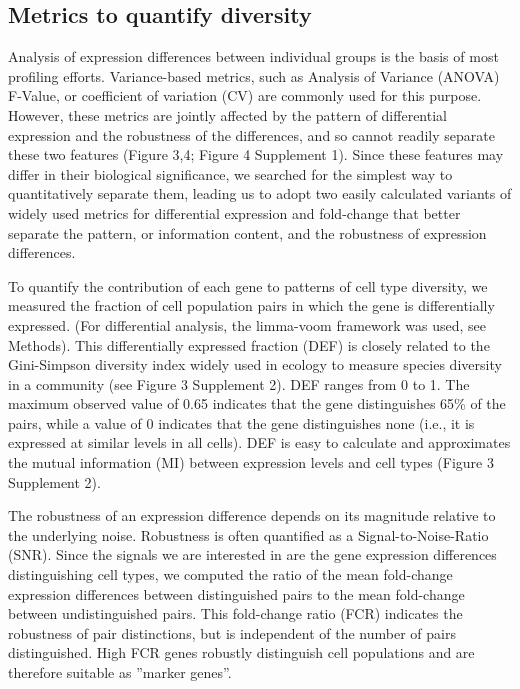 \subsection{Metrics to quantify diversity}
Analysis of expression differences between individual groups is the basis of most profiling efforts. Variance-based metrics, such as Analysis of Variance (ANOVA) F-Value, or coefficient of variation (CV) are commonly used for this purpose. However, these metrics are jointly affected by the pattern of differential expression and the robustness of the differences, and so cannot readily separate these two features (Figure 3,4; Figure 4 Supplement 1). Since these features may differ in their biological significance, we searched for the simplest way to quantitatively separate them, leading us to adopt two easily calculated variants of widely used metrics for differential expression and fold-change that better separate the pattern, or information content, and the robustness of expression differences.

To quantify the contribution of each gene to patterns of cell type diversity, we measured the fraction of cell population pairs in which the gene is differentially expressed. (For differential analysis, the limma-voom framework was used, see Methods). This differentially expressed fraction (DEF) is closely related to the Gini-Simpson diversity index \citep{Simpson_1949} widely used in ecology to measure species diversity in a community (see Figure 3 Supplement 2). DEF ranges from 0 to 1. The maximum observed value of 0.65 indicates that the gene distinguishes 65\% of the pairs, while a value of 0 indicates that the gene distinguishes none (i.e., it is expressed at similar levels in all cells). DEF is easy to calculate and approximates the mutual information (MI) between expression levels and cell types (Figure 3 Supplement 2). 

The robustness of an expression difference depends on its magnitude relative to the underlying noise. Robustness is often quantified as a Signal-to-Noise-Ratio (SNR). Since the signals we are interested in are the gene expression differences distinguishing cell types, we computed the ratio of the mean fold-change expression differences between distinguished pairs to the mean fold-change between undistinguished pairs. This fold-change ratio (FCR) indicates the robustness of pair distinctions, but is independent of the number of pairs distinguished. High FCR genes robustly distinguish cell populations and are therefore suitable as ”marker genes”. %

